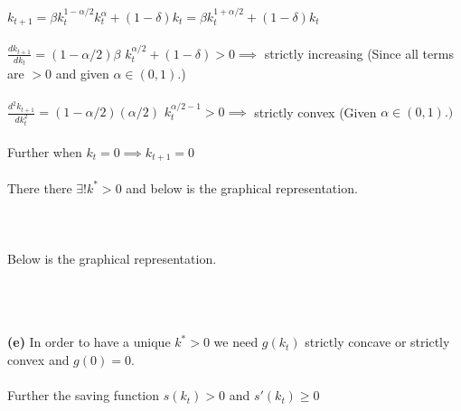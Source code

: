 \documentclass[11zpt]{article}
\newenvironment{problem}[2][Problem]{\begin{trivlist}
\item[\hskip \labelsep {\bfseries #1}\hskip \labelsep {\bfseries #2.}]}{\end{trivlist}}
\begin{document}
\begin{problem}{3}
\\
\\
$k_{t+1} = \beta k_t^{1-\alpha/2} k_t^\alpha + (1-\delta) k_t = \beta k_t^{1+\alpha/2} + (1-\delta) k_t$ \\ 
\\
$ \frac{dk_{t+1}}{dk_t} = (1-\alpha/2)\beta $ $ k_t^{ \alpha/2 }  + (1-\delta)  > 0 \implies $ strictly increasing (Since all terms are $ > 0 $ and given $\alpha \in (0,1). $)
\\ 
\\
$ \frac{d^2k_{t+1}}{dk_t^2} = (1-\alpha/2)(\alpha/2)$  $ k_t^{\alpha/2 -1 }  > 0 \implies$ strictly convex (Given $\alpha \in (0,1). )$ 
\\
\\
Further when $ k_t = 0 \implies  k_{t+1} = 0$ 
\\
\\
There there $ \exists ! k^ * > 0 $  and below is the graphical representation. 
\\
\\\\
\\
Below is the graphical representation. 
\\
\\
\pgfplotsset{width=12cm,compat=1.9}
\\
\\
\textbf{(e)} In order to have a unique $k^* > 0$ we need $g(k_t)$ strictly concave or strictly convex and $g(0) = 0 $.\\
\\
Further the saving function $ s(k_t) > 0$  and $ s'(k_t) \geq 0 $
\\
\\
\end{problem}
\end{document}
